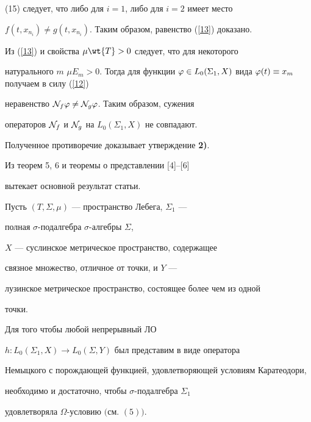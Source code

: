(15) следует, что либо для $i=1$, либо для $i=2$ имеет место


$f(t,x_{n_i})\ne g(t,x_{n_i})$. Таким образом, равенство (\ref{13}) доказано.





Из (\ref{13}) и свойства $\mu\wt{T}>0$ следует, что для некоторого


натурального $m$\; $\mu E_m>0$. Тогда для функции $\f\in


L_0(\Sigma_1,X)$ вида $\f(t)\equiv x_m$ получаем в силу (\ref{12})


неравенство ${\cal N}_f\varphi\ne{\cal N}_g\varphi$. Таким образом, сужения


операторов ${\cal N}_f$ и ${\cal N}_g$ на $L_0(\Sigma_1,X)$ не совпадают.


Полученное противоречие доказывает утверждение {\bf 2)}.







Из теорем 5, 6 и теоремы о представлении [4]--[6]


вытекает основной результат статьи.





\begin{thmmain}


Пусть $(T,\Sigma,\mu)$ --- пространство Лебега, $\Sigma_1$ ---


полная $\sigma$-подал\-гебра $\sigma$-ал\-геб\-ры $\Sigma$,


$X$ --- суслинское метрическое пространство, содержащее


связное множество, отличное от точки, и $Y$ ---


лузинское метрическое пространство, состоящее более чем из одной


точки.





Для того чтобы любой непрерывный ЛО 


$h:L_0(\Sigma_1,X)\to L_0(\Sigma,Y)$ был представим в виде оператора


Немыцкого с порождающей функцией, удовлетворяющей условиям Каратеодори,


необходимо и достаточно, чтобы $\sigma$-подал\-гебра $\Sigma_1$


удовлетворяла $\Omega$-ус\-ло\-вию $($см. $(5))$.


\end{thmmain}





